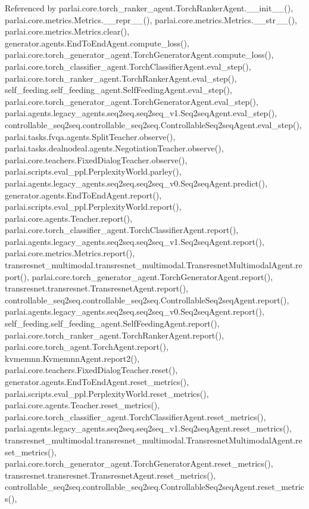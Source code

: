 Referenced by parlai.\+core.\+torch\+\_\+ranker\+\_\+agent.\+Torch\+Ranker\+Agent.\+\_\+\+\_\+init\+\_\+\+\_\+(), parlai.\+core.\+metrics.\+Metrics.\+\_\+\+\_\+repr\+\_\+\+\_\+(), parlai.\+core.\+metrics.\+Metrics.\+\_\+\+\_\+str\+\_\+\+\_\+(), parlai.\+core.\+metrics.\+Metrics.\+clear(), generator.\+agents.\+End\+To\+End\+Agent.\+compute\+\_\+loss(), parlai.\+core.\+torch\+\_\+generator\+\_\+agent.\+Torch\+Generator\+Agent.\+compute\+\_\+loss(), parlai.\+core.\+torch\+\_\+classifier\+\_\+agent.\+Torch\+Classifier\+Agent.\+eval\+\_\+step(), parlai.\+core.\+torch\+\_\+ranker\+\_\+agent.\+Torch\+Ranker\+Agent.\+eval\+\_\+step(), self\+\_\+feeding.\+self\+\_\+feeding\+\_\+agent.\+Self\+Feeding\+Agent.\+eval\+\_\+step(), parlai.\+core.\+torch\+\_\+generator\+\_\+agent.\+Torch\+Generator\+Agent.\+eval\+\_\+step(), parlai.\+agents.\+legacy\+\_\+agents.\+seq2seq.\+seq2seq\+\_\+v1.\+Seq2seq\+Agent.\+eval\+\_\+step(), controllable\+\_\+seq2seq.\+controllable\+\_\+seq2seq.\+Controllable\+Seq2seq\+Agent.\+eval\+\_\+step(), parlai.\+tasks.\+fvqa.\+agents.\+Split\+Teacher.\+observe(), parlai.\+tasks.\+dealnodeal.\+agents.\+Negotiation\+Teacher.\+observe(), parlai.\+core.\+teachers.\+Fixed\+Dialog\+Teacher.\+observe(), parlai.\+scripts.\+eval\+\_\+ppl.\+Perplexity\+World.\+parley(), parlai.\+agents.\+legacy\+\_\+agents.\+seq2seq.\+seq2seq\+\_\+v0.\+Seq2seq\+Agent.\+predict(), generator.\+agents.\+End\+To\+End\+Agent.\+report(), parlai.\+scripts.\+eval\+\_\+ppl.\+Perplexity\+World.\+report(), parlai.\+core.\+agents.\+Teacher.\+report(), parlai.\+core.\+torch\+\_\+classifier\+\_\+agent.\+Torch\+Classifier\+Agent.\+report(), parlai.\+agents.\+legacy\+\_\+agents.\+seq2seq.\+seq2seq\+\_\+v1.\+Seq2seq\+Agent.\+report(), parlai.\+core.\+metrics.\+Metrics.\+report(), transresnet\+\_\+multimodal.\+transresnet\+\_\+multimodal.\+Transresnet\+Multimodal\+Agent.\+report(), parlai.\+core.\+torch\+\_\+generator\+\_\+agent.\+Torch\+Generator\+Agent.\+report(), transresnet.\+transresnet.\+Transresnet\+Agent.\+report(), controllable\+\_\+seq2seq.\+controllable\+\_\+seq2seq.\+Controllable\+Seq2seq\+Agent.\+report(), parlai.\+agents.\+legacy\+\_\+agents.\+seq2seq.\+seq2seq\+\_\+v0.\+Seq2seq\+Agent.\+report(), self\+\_\+feeding.\+self\+\_\+feeding\+\_\+agent.\+Self\+Feeding\+Agent.\+report(), parlai.\+core.\+torch\+\_\+ranker\+\_\+agent.\+Torch\+Ranker\+Agent.\+report(), parlai.\+core.\+torch\+\_\+agent.\+Torch\+Agent.\+report(), kvmemnn.\+Kvmemnn\+Agent.\+report2(), parlai.\+core.\+teachers.\+Fixed\+Dialog\+Teacher.\+reset(), generator.\+agents.\+End\+To\+End\+Agent.\+reset\+\_\+metrics(), parlai.\+scripts.\+eval\+\_\+ppl.\+Perplexity\+World.\+reset\+\_\+metrics(), parlai.\+core.\+agents.\+Teacher.\+reset\+\_\+metrics(), parlai.\+core.\+torch\+\_\+classifier\+\_\+agent.\+Torch\+Classifier\+Agent.\+reset\+\_\+metrics(), parlai.\+agents.\+legacy\+\_\+agents.\+seq2seq.\+seq2seq\+\_\+v1.\+Seq2seq\+Agent.\+reset\+\_\+metrics(), transresnet\+\_\+multimodal.\+transresnet\+\_\+multimodal.\+Transresnet\+Multimodal\+Agent.\+reset\+\_\+metrics(), parlai.\+core.\+torch\+\_\+generator\+\_\+agent.\+Torch\+Generator\+Agent.\+reset\+\_\+metrics(), transresnet.\+transresnet.\+Transresnet\+Agent.\+reset\+\_\+metrics(), controllable\+\_\+seq2seq.\+controllable\+\_\+seq2seq.\+Controllable\+Seq2seq\+Agent.\+reset\+\_\+metrics(), 